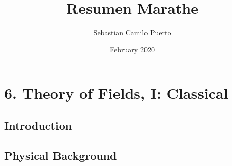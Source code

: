\documentclass[12pt]{report}
\title{Resumen Marathe}
\date{February 2020}
\author{Sebastian Camilo Puerto}
\begin{document}
\maketitle

\chapter*{6. Theory of Fields, I: Classical}
\section{Introduction}

\section{Physical Background}
\end{document}
